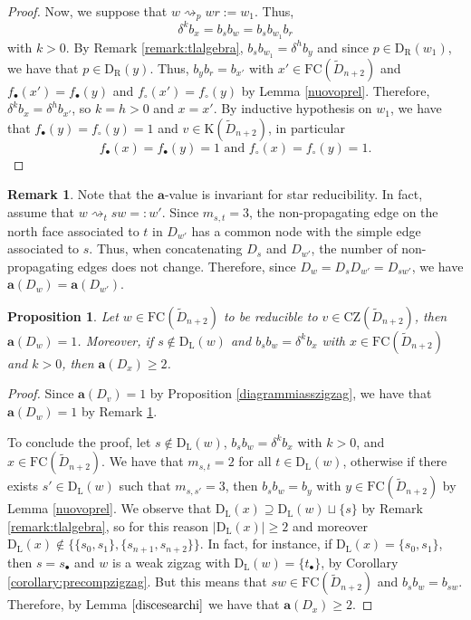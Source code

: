 \documentclass{amsart}
\newcommand{\D}{{\widetilde{D}_{n+2}}}
\newcommand{\ld}{{\mathrm{D}_{\mathrm{L}}}}
\newcommand{\rd}{{\mathrm{D}_{\mathrm{R}}}}
\newcommand{\fc}{{\mathrm{FC}}}
\newcommand{\s}{{s_{\bullet}}}
\newcommand{\ti}{{t_{\bullet}}}
\newcommand{\zz}{\mathrm{CZ}}
\newcommand{\car}{\mathrm{K}}
\newcommand{\red}{\rightsquigarrow}
\newcommand{\ab}{\mathbf{a}}
\newtheorem{Proposition}[Theorem]{Proposition}
\theoremstyle{definition}
\newtheorem{Remark}[Theorem]{Remark}
\begin{document}
\begin{proof}
 Now, we suppose that $w\red_p wr:=w_1$. Thus, \[\delta ^kb_x=b_sb_w=b_sb_{w_1}b_{r}\] with $k>0$. By Remark \ref{remark:tlalgebra}, $b_sb_{w_1}= \delta ^hb_y$ and since $p\in \rd(w_1)$, we have that $p\in \rd(y)$. Thus, $b_yb_r=b_{x'}$ with $x'\in \fc(\D)$ and $f_\bullet(x')=f_\bullet(y)$ and $f_\circ(x')=f_\circ(y)$ by Lemma \ref{nuovoprel}. Therefore, $\delta ^k b_x=\delta^h b_{x'}$, so $k=h>0$ and $x=x'$. By inductive hypothesis on $w_1$, we have that $f_\bullet(y)=f_\circ(y)=1$ and $v\in \car(\D)$, in particular \[f_\bullet(x)=f_\bullet(y)=1 \mbox{ and }f_\circ(x)=f_\circ(y)=1.\]

\end{proof}






\begin{Remark}
\label{remark:a-value}
    Note that the $\mathbf{a}$-value is invariant for star reducibility. In fact, assume that $w\red_{t}sw=:w'$. Since $m_{s,t}=3$, the non-propagating edge on the north face associated to $t$ in $D_{w'}$ has a common node with the simple edge associated to $s$. Thus, when concatenating $D_s$ and $D_{w'}$, the number of non-propagating edges does not change. Therefore, since $D_w=D_sD_{w'}=D_{sw'}$, we have $\ab(D_w)=\ab(D_{w'})$.
\end{Remark}

\begin{Proposition}
\label{nuovotre}
Let $w\in \fc(\D)$ to be reducible to $v\in \zz(\D)$, then $\mathbf{a}(D_w)=1$. Moreover, if $s\notin \ld(w)$ and $b_sb_w=\delta ^kb_x$ with $x\in \fc(\D)$ and $k>0$, then $\mathbf{a}(D_x)\ge 2$. 
\end{Proposition}

\begin{proof}
Since $\ab(D_v)=1$ by Proposition \ref{diagrammiasszigzag}, we have that $\ab(D_w)=1$ by Remark \ref{remark:a-value}. 

To conclude the proof, let $s\notin \ld(w)$, $b_sb_w=\delta^k b_x$ with $k>0$, and $x\in \fc(\D)$. We have that $m_{s,t}=2$ for all $t\in \ld(w)$, otherwise if there exists $s'\in \ld(w)$ such that $m_{s,s'}=3$, then $b_sb_{w}=b_y$ with $y\in \fc(\D)$ by Lemma \ref{nuovoprel}. We observe that $\ld(x)\supseteq \ld(w)\sqcup \{s\}$ by Remark \ref{remark:tlalgebra}, so for this reason $\left | \ld(x)\right |\ge 2$ and moreover $\ld(x)\notin \{\{s_0,s_1\},\{s_{n+1},s_{n+2}\}\}$. In fact, for instance, if $\ld(x)=\{s_0,s_1\}$, then $s=\s$ and $w$ is a weak zigzag with $\ld(w)=\{\ti\}$, by Corollary \ref{corollary:precompzigzag}. But this means that $sw\in \fc(\D)$ and $b_sb_w=b_{sw}$. 
Therefore, by Lemma $\ref{discesearchi}$ we have that $\mathbf{a}(D_x)\ge 2$.

\end{proof}
\end{document}
